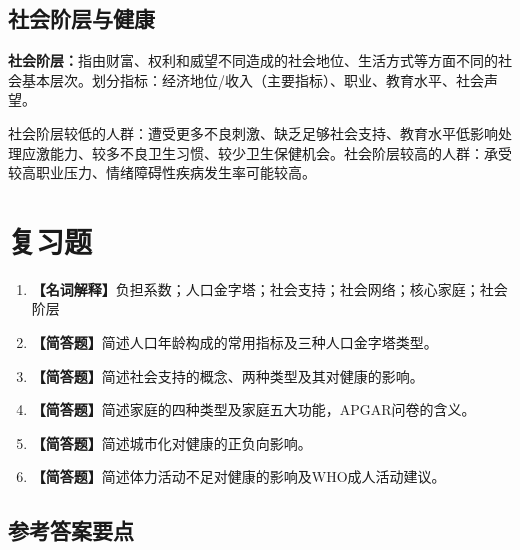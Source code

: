 \subsection{社会阶层与健康}

\begin{defbox}
\textbf{社会阶层：}指由财富、权利和威望不同造成的社会地位、生活方式等方面不同的社会基本层次。划分指标：经济地位/收入（主要指标）、职业、教育水平、社会声望。

社会阶层较低的人群：遭受更多不良刺激、缺乏足够社会支持、教育水平低影响处理应激能力、较多不良卫生习惯、较少卫生保健机会。社会阶层较高的人群：承受较高职业压力、情绪障碍性疾病发生率可能较高。
\end{defbox}

\section{复习题}

\begin{enumerate}[leftmargin=*, itemsep=8pt]
    \item \textbf{【名词解释】}负担系数；人口金字塔；社会支持；社会网络；核心家庭；社会阶层
    \item \textbf{【简答题】}简述人口年龄构成的常用指标及三种人口金字塔类型。
    \item \textbf{【简答题】}简述社会支持的概念、两种类型及其对健康的影响。
    \item \textbf{【简答题】}简述家庭的四种类型及家庭五大功能，APGAR问卷的含义。
    \item \textbf{【简答题】}简述城市化对健康的正负向影响。
    \item \textbf{【简答题】}简述体力活动不足对健康的影响及WHO成人活动建议。
\end{enumerate}

\subsection*{参考答案要点}


